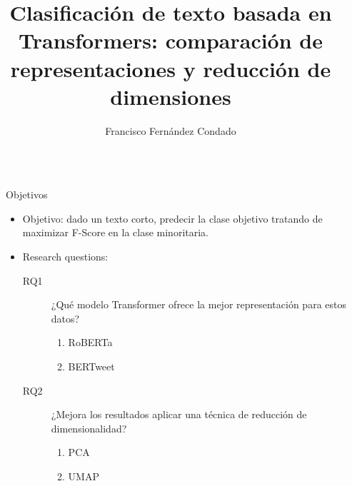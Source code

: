\documentclass[final]{beamer}
\title{Clasificación de texto basada en Transformers: comparación de representaciones y reducción de dimensiones} %
\author{Francisco Fernández Condado} %
\institute{Universidad del País Vasco / Euskal Herriko Unibertsitatea} %
\newlength{\sepwid}
\newlength{\onecolwid}
\begin{document}

\setlength{\belowcaptionskip}{2ex} %
\setlength\belowdisplayshortskip{2ex} %

\begin{frame}[t] %

\begin{columns}[t] %

\begin{column}{\sepwid}\end{column} %

\begin{column}{\onecolwid} %


\begin{alertblock}{Objetivos}
\begin{itemize}
\item Objetivo: dado un texto corto, predecir la clase objetivo tratando de maximizar F-Score en la clase minoritaria.
\item Research questions: 
    \begin{description}
    \item[RQ1] ¿Qué modelo Transformer ofrece la mejor representación para estos datos?
    	\begin{enumerate}
    	\item RoBERTa
    	\item BERTweet
    	\end{enumerate}
    \item[RQ2] ¿Mejora los resultados aplicar una técnica de reducción de dimensionalidad?
        \begin{enumerate}
        	\item PCA
        	\item UMAP
        	\end{enumerate}
    \end{description}
\end{itemize}
\end{alertblock}


\end{column}
\end{columns}
\end{frame}
\end{document}
